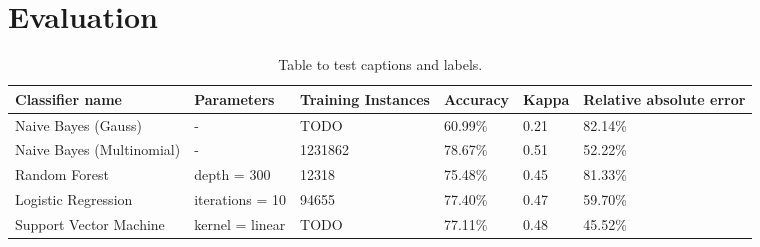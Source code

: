 \section{Evaluation}
\begin{table}[h!]
\centering
\caption{Table to test captions and labels.}
\begin{tabular}{ |p{3cm}||p{3cm}|p{2cm}|p{2cm}|p{2cm}|p{2cm}|  }
 \hline
 Classifier name &          Parameters &             Training Instances &    Accuracy &      Kappa &     Relative absolute error \\
 \hline
 Naive Bayes (Gauss)        &-&            TODO&                 60.99\%&        0.21&       82.14\%\\
  \hline
 Naive Bayes (Multinomial)  &-&                     1231862&                78.67\%&        0.51&       52.22\%\\
  \hline
 Random Forest              &depth = 300&            12318&                 75.48\%&        0.45&       81.33\%\\
  \hline
 Logistic Regression        &iterations = 10&            94655&                 77.40\%&        0.47&       59.70\%\\
  \hline
 Support Vector Machine     &kernel = linear&            TODO&                 77.11\%&        0.48&       45.52\%\\
 \hline
\end{tabular}
\label{tab:evaluations}
\end{table}
